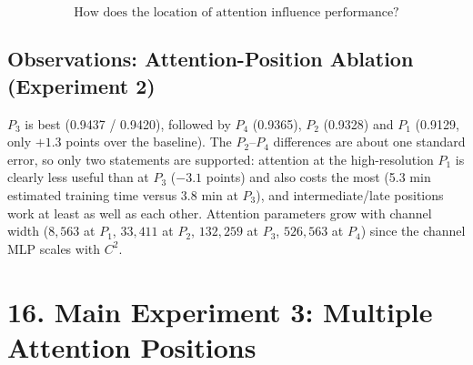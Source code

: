\documentclass[10pt]{article}
\begin{document}
\[
\boxed{
\text{How does the location of attention influence performance?}
}
\]


\subsection*{Observations: Attention-Position Ablation (Experiment 2)}
\begin{table}[H]
\centering
\caption{Experiment 2 -- Channel$\to$Spatial attention at $P_1$ (B1), $P_2$ (B2), $P_3$ (B3 = A3) and $P_4$ (B4).}
\scriptsize
{}
\end{table}

$P_3$ is best (0.9437 / 0.9420), followed by $P_4$ (0.9365), $P_2$ (0.9328) and $P_1$ (0.9129, only $+1.3$ points over the baseline). The $P_2$--$P_4$ differences are about one standard error, so only two statements are supported: attention at the high-resolution $P_1$ is clearly less useful than at $P_3$ ($-3.1$ points) and also costs the most (5.3 min estimated training time versus 3.8 min at $P_3$), and intermediate/late positions work at least as well as each other. Attention parameters grow with channel width ($8{,}563$ at $P_1$, $33{,}411$ at $P_2$, $132{,}259$ at $P_3$, $526{,}563$ at $P_4$) since the channel MLP scales with $C^2$.

\section*{16. Main Experiment 3: Multiple Attention Positions}
\end{document}
